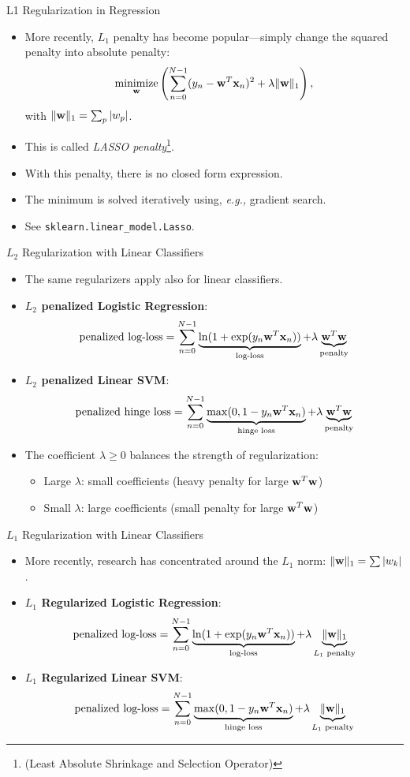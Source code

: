 \documentclass[10pt, aspectratio=169]{beamer} %
\DeclareMathOperator*{\minimize}{minimize} %
\newcommand{\w}{{\bf w}}
\newcommand{\x}{{\bf x}}
\begin{document}
\begin{frame}[fragile]{L1 Regularization in Regression}
\begin{itemize}
\item More recently, $L_1$ penalty has become popular---simply change the squared penalty into absolute penalty:
\[
\minimize_{\w}\left( \sum_{n = 0}^{N-1} (y_n - \w^T\x_n)^2 + \lambda\| \w\|_1 \right),
\]
with $\| \w \|_1 = \sum_p |w_p|$.
\item This is called \emph{LASSO penalty}\footnote{(Least Absolute Shrinkage and Selection Operator)}.
\item With this penalty, there is no closed form expression. 
\item The minimum is solved iteratively using, \emph{e.g.,} gradient search.
\item See \verb+sklearn.linear_model.Lasso+.
\end{itemize}
\end{frame}

\begin{frame}{$L_2$ Regularization with Linear Classifiers}
\begin{itemize}
\item The same regularizers apply also for linear classifiers.
\item \textbf{$L_2$ penalized Logistic Regression}:
\[
\text{penalized log-loss} = \sum_{n = 0}^{N-1}\underbrace{ \ln(1 + \exp(y_n\w^T\x_n))}_{\text {log-loss}} + \lambda \underbrace{\w^T\w}_{\text{penalty}}
\]
\item \textbf{$L_2$ penalized Linear SVM}:
\[
\text{penalized hinge loss} = \sum_{n = 0}^{N-1}\underbrace{ \max(0, 1-y_n\w^T\x_n)}_{\text {hinge loss}} + \lambda \underbrace{\w^T\w}_{\text{penalty}}
\]
\item The coefficient $\lambda\ge 0$ balances the strength of regularization:
\begin{itemize}
	\item Large $\lambda$: small coefficients (heavy penalty for large $\w^T\w$)
	\item Small $\lambda$: large coefficients (small penalty for large $\w^T\w$)
\end{itemize}
\end{itemize}
\end{frame}

\begin{frame}{$L_1$ Regularization with Linear Classifiers}
\begin{itemize}
	\item More recently, research has concentrated around the $L_1$ norm: $\|\w\|_1 = \sum |w_k|$.
\item \textbf{$L_1$ Regularized Logistic Regression}:
\[
\text{penalized log-loss} = \sum_{n = 0}^{N-1}\underbrace{ \ln(1 + \exp(y_n\w^T\x_n))}_{\text {log-loss}} + \lambda \underbrace{\|\w\|_1}_{L_1 \text{ penalty}}
\]
\item \textbf{$L_1$ Regularized Linear SVM}:
\[
\text{penalized log-loss} = \sum_{n = 0}^{N-1}\underbrace{ \max(0, 1-y_n\w^T\x_n)}_{\text {hinge loss}} + \lambda \underbrace{\|\w\|_1}_{L_1 \text{ penalty}}
\]
\end{itemize}
\end{frame}
\end{document}
